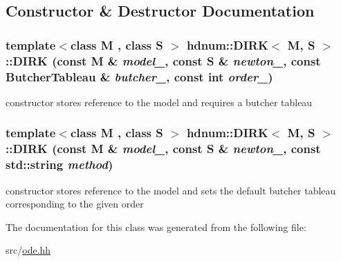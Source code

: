 \subsection{Constructor \& Destructor Documentation}
\hypertarget{classhdnum_1_1DIRK_a4c6a823702e9e8b885cd4b81be861d51}{
\subsubsection[{DIRK}]{\setlength{\rightskip}{0pt plus 5cm}template$<$class M , class S $>$ {\bf hdnum::DIRK}$<$ M, S $>$::{\bf DIRK} (const M \& {\em model\_\-}, \/  const S \& {\em newton\_\-}, \/  const {\bf ButcherTableau} \& {\em butcher\_\-}, \/  const int {\em order\_\-})}}
\label{classhdnum_1_1DIRK_a4c6a823702e9e8b885cd4b81be861d51}
constructor stores reference to the model and requires a butcher tableau \hypertarget{classhdnum_1_1DIRK_ab914c53100346697592513bdae05c668}{
\subsubsection[{DIRK}]{\setlength{\rightskip}{0pt plus 5cm}template$<$class M , class S $>$ {\bf hdnum::DIRK}$<$ M, S $>$::{\bf DIRK} (const M \& {\em model\_\-}, \/  const S \& {\em newton\_\-}, \/  const std::string {\em method})}}
\label{classhdnum_1_1DIRK_ab914c53100346697592513bdae05c668}
constructor stores reference to the model and sets the default butcher tableau corresponding to the given order 

The documentation for this class was generated from the following file:\begin{DoxyCompactItemize}
\item 
src/\hyperlink{ode_8hh}{ode.hh}\end{DoxyCompactItemize}
